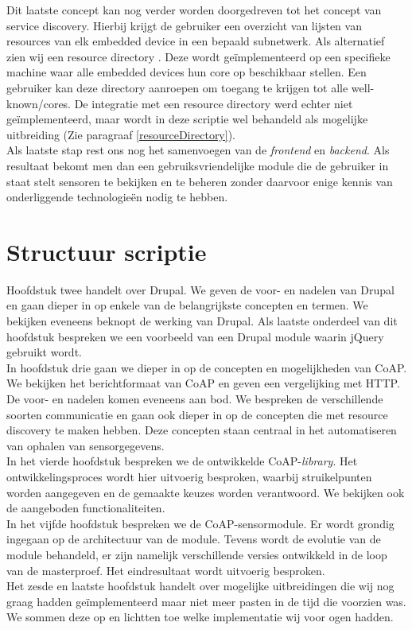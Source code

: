 Dit laatste concept kan nog verder worden doorgedreven tot het concept van service discovery. Hierbij krijgt de gebruiker een overzicht van lijsten van resources van elk embedded device in een bepaald subnetwerk. Als alternatief zien wij een resource directory \cite{coapDraft, coapDiscovery}. Deze wordt ge\"{i}mplementeerd op een specifieke machine waar alle embedded devices hun core op beschikbaar stellen. Een gebruiker kan deze directory aanroepen om toegang te krijgen tot alle well-known/cores. De integratie met een resource directory werd echter niet ge\"{i}mplementeerd, maar wordt in deze scriptie wel behandeld als mogelijke uitbreiding (Zie paragraaf \ref{resourceDirectory}).\\
Als laatste stap rest ons nog het samenvoegen van de \textit{frontend} en \textit{backend}. Als resultaat bekomt men dan een gebruiksvriendelijke module die de gebruiker in staat stelt sensoren te bekijken en te beheren zonder daarvoor enige kennis van onderliggende technologie\"{e}n nodig te hebben.


\section{Structuur scriptie}
Hoofdstuk twee handelt over Drupal. We geven de voor- en nadelen van Drupal en gaan dieper in op enkele van de belangrijkste concepten en termen. We bekijken eveneens beknopt de werking van Drupal. Als laatste onderdeel van dit hoofdstuk bespreken we een voorbeeld van een Drupal module waarin jQuery gebruikt wordt.\\

In hoofdstuk drie gaan we dieper in op de concepten en mogelijkheden van CoAP. We bekijken het berichtformaat van CoAP en geven een vergelijking met HTTP. De voor- en nadelen komen eveneens aan bod. We bespreken de verschillende soorten communicatie en gaan ook dieper in op de concepten die met resource discovery te maken hebben. Deze concepten staan centraal in het automatiseren van ophalen van sensorgegevens.\\

In het vierde hoofdstuk bespreken we de ontwikkelde CoAP-\textit{library}. Het ontwikkelingsproces wordt hier uitvoerig besproken, waarbij struikelpunten worden aangegeven en de gemaakte keuzes worden verantwoord. We bekijken ook de aangeboden functionaliteiten.\\

In het vijfde hoofdstuk bespreken we de CoAP-sensormodule. Er wordt grondig ingegaan op de architectuur van de module. Tevens wordt de evolutie van de module behandeld, er zijn namelijk verschillende versies ontwikkeld in de loop van de masterproef. Het eindresultaat wordt uitvoerig besproken.\\

Het zesde en laatste hoofdstuk handelt over mogelijke uitbreidingen die wij nog graag hadden ge\"{i}mplementeerd maar niet meer pasten in de tijd die voorzien was. We sommen deze op en lichtten toe welke implementatie wij voor ogen hadden.










